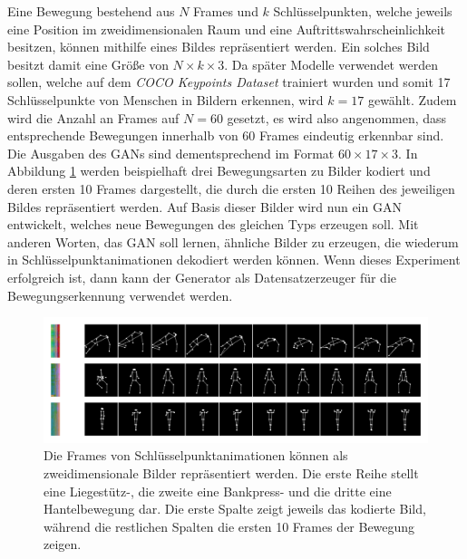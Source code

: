 Eine Bewegung bestehend aus $N$ Frames und $k$ Schlüsselpunkten, welche jeweils
eine Position im zweidimensionalen Raum und eine Auftrittswahrscheinlichkeit
besitzen, können mithilfe eines Bildes repräsentiert werden. Ein solches Bild
besitzt damit eine Größe von $N \times k \times 3$. Da später Modelle
verwendet werden sollen, welche auf dem \textit{COCO Keypoints Dataset}
\cite{lin2015microsoft} trainiert wurden und somit 17 Schlüsselpunkte von
Menschen in Bildern erkennen, wird $k = 17$ gewählt. Zudem wird die Anzahl an
Frames auf $N = 60$ gesetzt, es wird also angenommen, dass entsprechende
Bewegungen innerhalb von 60 Frames eindeutig erkennbar sind. Die Ausgaben des
GANs sind dementsprechend im Format $60 \times 17 \times 3$. In Abbildung
\ref{fig:motion-images} werden beispielhaft drei Bewegungsarten zu Bilder
kodiert und deren ersten 10 Frames dargestellt, die durch die ersten 10 Reihen
des jeweiligen Bildes repräsentiert werden. Auf Basis dieser Bilder wird nun ein
GAN entwickelt, welches neue Bewegungen des gleichen Typs erzeugen soll. Mit
anderen Worten, das GAN soll lernen, ähnliche Bilder zu erzeugen, die wiederum
in Schlüsselpunktanimationen dekodiert werden können.  Wenn dieses Experiment
erfolgreich ist, dann kann der Generator als Datensatzerzeuger für die
Bewegungserkennung verwendet werden.

\begin{figure}
    \includegraphics[width=\textwidth]{images/motion_image.png}
    \caption{Die Frames von Schlüsselpunktanimationen können als
    zweidimensionale Bilder repräsentiert werden. Die erste Reihe stellt eine
    Liegestütz-, die zweite eine Bankpress- und die dritte eine Hantelbewegung
    dar. Die erste Spalte zeigt jeweils das kodierte Bild, während die
    restlichen Spalten die ersten 10 Frames der Bewegung zeigen.}
    \label{fig:motion-images}
\end{figure}

